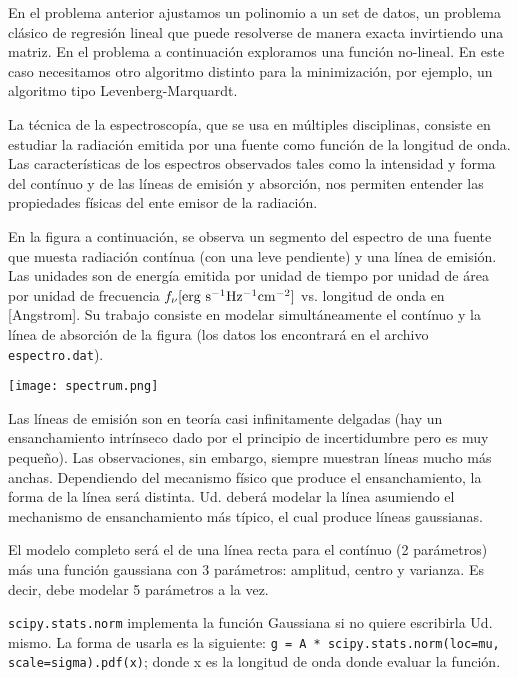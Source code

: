\documentclass[letter, 11pt]{article}
\begin{document}
\pagebreak
{}

\begin{ayuda}
  En el problema anterior ajustamos un polinomio a un set de datos, un problema
  clásico de regresión lineal que puede resolverse de manera exacta invirtiendo
  una matriz. En el problema a continuación exploramos una función no-lineal.
  En este caso necesitamos otro algoritmo distinto para la minimización, por
  ejemplo, un algoritmo tipo Levenberg-Marquardt.
\end{ayuda}

La técnica de la espectroscopía, que se usa en múltiples disciplinas, consiste
en estudiar la radiación emitida por una fuente como función de la longitud de
onda. Las características de los espectros observados tales como la intensidad
y forma del contínuo y de las líneas de emisión y absorción, nos permiten
entender las propiedades físicas del ente emisor de la radiación.

En la figura a continuación, se observa un segmento del espectro de una fuente
que muesta radiación contínua (con una leve pendiente) y una línea de emisión.
Las unidades son de energía emitida por unidad de tiempo por unidad de área por
unidad de frecuencia $f_\nu [{\rm erg\ s^{-1} Hz^{-1} cm^{-2}}]$ vs.  longitud
de onda en [Angstrom]. Su trabajo consiste en modelar simultáneamente el
contínuo y la línea de absorción de la figura (los datos los encontrará en el
archivo \texttt{espectro.dat}).

\begin{center}
\texttt{[image: spectrum.png]}
\end{center}

Las líneas de emisión son en teoría casi infinitamente delgadas (hay un
ensanchamiento intrínseco dado por el principio de incertidumbre pero es muy
pequeño). Las observaciones, sin embargo, siempre muestran líneas mucho más
anchas. Dependiendo del mecanismo físico que produce el ensanchamiento, la
forma de la línea será distinta. Ud. deberá modelar la línea asumiendo el
mechanismo de ensanchamiento más típico, el cual produce líneas gaussianas.

El modelo completo será el de una línea recta para el contínuo (2 parámetros)
más una función gaussiana con 3 parámetros: amplitud, centro y varianza. Es
decir, debe modelar 5 parámetros a la vez.

  \begin{ayuda}
    \texttt{scipy.stats.norm} implementa la función Gaussiana si no quiere
    escribirla Ud. mismo. La forma de usarla es la siguiente: \texttt{g = A *
    scipy.stats.norm(loc=mu, scale=sigma).pdf(x)}; donde x es la longitud de
    onda donde evaluar la función.
  \end{ayuda}
\end{document}
